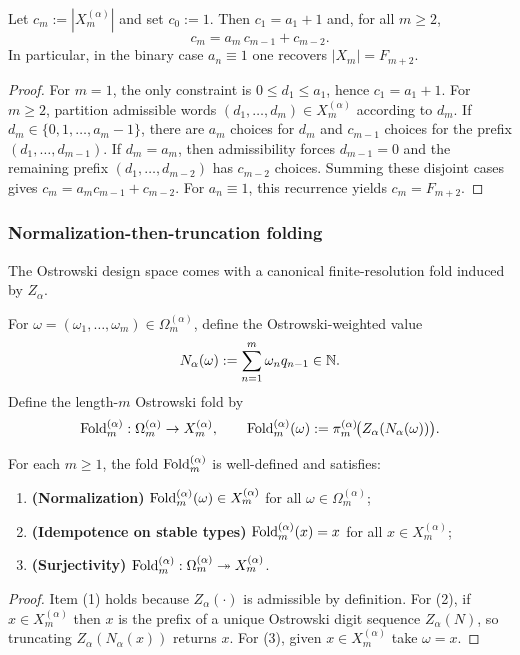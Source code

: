 \begin{proposition}\label{prop:ostrowski-admissible-count}
Let $c_m:=|X_m^{(\alpha)}|$ and set $c_0:=1$.
Then $c_1=a_1+1$ and, for all $m\ge 2$,
\[
c_m=a_m\,c_{m-1}+c_{m-2}.
\]
In particular, in the binary case $a_n\equiv 1$ one recovers $|X_m|=F_{m+2}$.
\end{proposition}
\begin{proof}
For $m=1$, the only constraint is $0\le d_1\le a_1$, hence $c_1=a_1+1$.
For $m\ge 2$, partition admissible words $(d_1,\dots,d_m)\in X_m^{(\alpha)}$ according to $d_m$.
If $d_m\in\{0,1,\dots,a_m-1\}$, there are $a_m$ choices for $d_m$ and $c_{m-1}$ choices for the prefix $(d_1,\dots,d_{m-1})$.
If $d_m=a_m$, then admissibility forces $d_{m-1}=0$ and the remaining prefix $(d_1,\dots,d_{m-2})$ has $c_{m-2}$ choices.
Summing these disjoint cases gives $c_m=a_m c_{m-1}+c_{m-2}$.
For $a_n\equiv 1$, this recurrence yields $c_m=F_{m+2}$.
\end{proof}

\subsubsection{Normalization-then-truncation folding}
The Ostrowski design space comes with a canonical finite-resolution fold induced by $Z_\alpha$.

\begin{definition}\label{def:fold-ostrowski}
For $\omega=(\omega_1,\dots,\omega_m)\in\Omega_m^{(\alpha)}$, define the Ostrowski-weighted value
\[
N_\alpha(\omega):=\sum_{n=1}^{m}\omega_n q_{n-1}\in\mathbb{N}.
\]
Define the length-$m$ Ostrowski fold by
\[
\mathrm{Fold}_m^{(\alpha)}:\Omega_m^{(\alpha)}\to X_m^{(\alpha)},
\qquad
\mathrm{Fold}_m^{(\alpha)}(\omega):=\pi_m^{(\alpha)}\!\bigl(Z_\alpha(N_\alpha(\omega))\bigr).
\]
\end{definition}

\begin{proposition}\label{prop:fold-ostrowski-basic}
For each $m\ge 1$, the fold $\mathrm{Fold}_m^{(\alpha)}$ is well-defined and satisfies:
\begin{enumerate}
  \item \textbf{(Normalization)} $\mathrm{Fold}_m^{(\alpha)}(\omega)\in X_m^{(\alpha)}$ for all $\omega\in\Omega_m^{(\alpha)}$;
  \item \textbf{(Idempotence on stable types)} $\mathrm{Fold}_m^{(\alpha)}(x)=x$ for all $x\in X_m^{(\alpha)}$;
  \item \textbf{(Surjectivity)} $\mathrm{Fold}_m^{(\alpha)}:\Omega_m^{(\alpha)}\twoheadrightarrow X_m^{(\alpha)}$.
\end{enumerate}
\end{proposition}
\begin{proof}
Item (1) holds because $Z_\alpha(\cdot)$ is admissible by definition.
For (2), if $x\in X_m^{(\alpha)}$ then $x$ is the prefix of a unique Ostrowski digit sequence $Z_\alpha(N)$, so truncating $Z_\alpha(N_\alpha(x))$ returns $x$.
For (3), given $x\in X_m^{(\alpha)}$ take $\omega=x$.
\end{proof}

